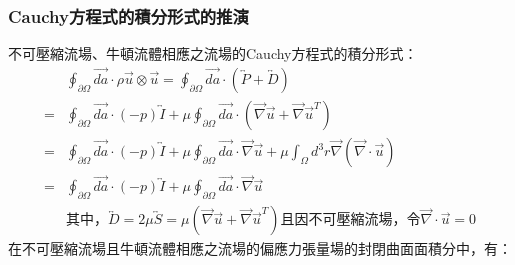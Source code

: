 \documentclass[12pt]{article}
\theoremstyle{upright}
\begin{document}
\subsubsection{Cauchy方程式的積分形式的推演}
\noindent 不可壓縮流場、牛頓流體相應之流場的Cauchy方程式的積分形式：
\begin{equation}\begin{aligned}
    &\oint_{\partial \Omega} \vec{da}\cdot \rho \vec{u} \otimes \vec{u} = \oint_{\partial \Omega} \vec{da}\cdot \left(\overleftrightarrow{P} + \overleftrightarrow{D}\right)\\[1.5ex]
    =&\oint _{\partial \Omega} \vec{da}\cdot (-p)\overleftrightarrow{I} + \mu\oint_{\partial \Omega} \vec{da} \cdot \left(\vec{\nabla}\vec{u} + \vec{\nabla }\vec{u}^{T}\right)\\[1.5ex]
    =& \oint_{\partial \Omega} \vec{da}\cdot (-p)\overleftrightarrow{I}  + \mu\oint_{\partial \Omega}  \vec{da} \cdot  \vec{\nabla }\vec{u} + \mu \int_{\Omega} d^3r \vec{\nabla }\left(\vec{\nabla}\cdot \vec{u}\right)\\[1.5ex]
    =& \oint_{\partial \Omega} \vec{da}\cdot (-p)\overleftrightarrow{I}  + \mu\oint_{\partial \Omega}  \vec{da} \cdot  \vec{\nabla }\vec{u} \\[1.5ex]
    &\text{其中，}\overleftrightarrow{D} = 2\mu\overleftrightarrow{S} = \mu\left(\vec{\nabla }\vec{u} + \vec{\nabla }\vec{u}^{T} \right) \text{且因不可壓縮流場，令} \vec{\nabla }\cdot \vec{u} = 0 
\end{aligned}\end{equation}
\noindent 在不可壓縮流場且牛頓流體相應之流場的偏應力張量場的封閉曲面面積分中，有：
\end{document}
